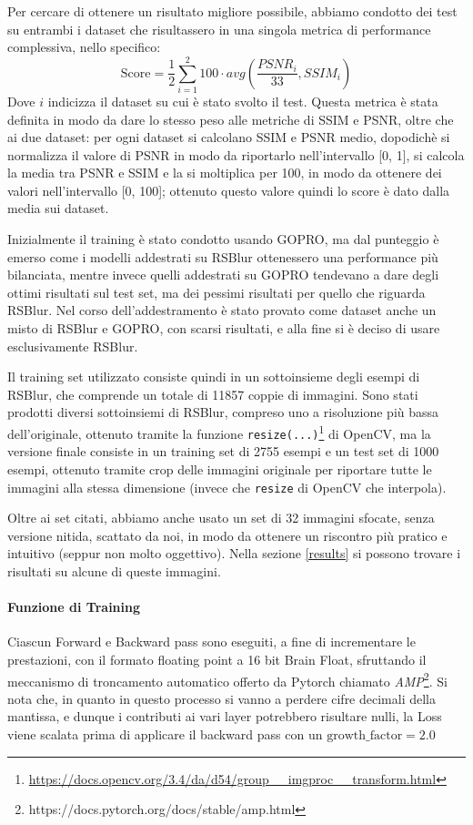 \documentclass[a4paper,10pt,twocolumn]{article}
\begin{document}
Per cercare di ottenere un risultato migliore possibile, abbiamo condotto dei test su entrambi i dataset che risultassero in una singola metrica di performance complessiva, nello specifico:
\[ \text{Score} = \frac{1}{2}\sum_{i=1}^2 100 \cdot avg(\frac{PSNR_i}{33}, SSIM_i)\]
Dove $i$ indicizza il dataset su cui è stato svolto il test. Questa metrica è stata definita in modo da dare lo stesso peso alle metriche di SSIM e PSNR, oltre che ai due dataset: per ogni dataset si calcolano SSIM e PSNR medio, dopodichè si normalizza
il valore di PSNR in modo da riportarlo nell'intervallo [0, 1], si calcola la media tra PSNR e SSIM e la si moltiplica per 100, in modo da ottenere dei valori nell'intervallo [0, 100]; ottenuto questo valore quindi lo score è dato dalla media sui dataset.

Inizialmente il training è stato condotto usando GOPRO, ma dal punteggio è emerso come i modelli addestrati su RSBlur ottenessero una performance più bilanciata, mentre invece quelli addestrati su GOPRO tendevano a dare degli ottimi risultati sul test set, ma dei pessimi
risultati per quello che riguarda RSBlur. Nel corso dell'addestramento è stato provato come dataset anche un misto di RSBlur e GOPRO, con scarsi risultati, e alla fine si è deciso di usare esclusivamente RSBlur.

Il training set utilizzato consiste quindi in un sottoinsieme degli esempi di RSBlur, che comprende un totale di 11857 coppie di immagini. Sono stati prodotti diversi sottoinsiemi di RSBlur, compreso uno a risoluzione più bassa dell'originale, ottenuto tramite la funzione \texttt{resize(...)}\footnote{\url{https://docs.opencv.org/3.4/da/d54/group__imgproc__transform.html}} di OpenCV,
ma la versione finale consiste in un training set di 2755 esempi e un test set di 1000 esempi, ottenuto tramite crop delle immagini originale per riportare tutte le immagini alla stessa dimensione (invece che \texttt{resize} di OpenCV che interpola).

Oltre ai set citati, abbiamo anche usato un set di 32 immagini sfocate, senza versione nitida, scattato da noi, in modo da ottenere un riscontro più pratico e intuitivo (seppur non molto oggettivo). Nella sezione \ref{results} si possono trovare i risultati su alcune di queste immagini.

\paragraph{Funzione di Training}
Ciascun Forward e Backward pass sono eseguiti, a fine di incrementare le prestazioni, con il formato floating point a 16 bit Brain Float,
sfruttando il meccanismo di troncamento automatico offerto da Pytorch chiamato \textit{AMP}\footnote{https://docs.pytorch.org/docs/stable/amp.html}.
Si nota che, in quanto in questo processo si vanno a perdere cifre decimali della mantissa, e dunque i contributi ai vari layer potrebbero risultare nulli,
la Loss viene scalata prima di applicare il backward pass con un $\mathrm{growth\_factor} = 2.0$
\end{document}
